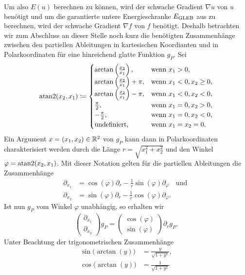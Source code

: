 Um also $E(u)$ berechnen zu können, wird der schwache Gradient $\nabla u$ von
$u$ benötigt und um die garantierte untere Energieschranke $E_\textup{GLEB}$ aus
 zu berechnen, wird der schwache Gradient $\nabla f$ von $f$
benötigt.
Deshalb betrachten wir zum Abschluss an dieser Stelle noch kurz die benötigten
Zusammenhänge zwischen den partiellen Ableitungen in kartesischen Koordianten
und in Polarkoordinaten für eine hinreichend glatte Funktion $g_P$.
Sei
\begin{align*}
  \operatorname{atan2}(x_2,x_1)\coloneqq
  \begin{cases}
    \arctan\left( \frac{x_2}{x_1} \right),& \text{wenn }x_1>0,\\
    \arctan\left( \frac{x_2}{x_1} \right) +\pi,& \text{wenn }x_1<0,x_2\geq 0,\\
    \arctan\left( \frac{x_2}{x_1} \right) -\pi,& \text{wenn }x_1<0,x_2<0,\\
    \frac{\pi}{2},& \text{wenn }x_1=0,x_2>0,\\
    -\frac{\pi}{2},& \text{wenn }x_1=0,x_2<0,\\
    \text{undefiniert},& \text{wenn }x_1=x_2=0.
  \end{cases}
\end{align*}
Ein Argument $x=(x_1,x_2)\in\mathbb{R}^2$ von $g_P$ kann dann in Polarkoordinaten 
charakterisiert werden durch die Länge $r=\sqrt{x_1^2+x_2^2}$ und den Winkel
$\varphi = \operatorname{atan2}(x_2,x_1)$.
Mit dieser Notation gelten für die partiellen Ableitungen die Zusammenhänge
\begin{align*}
  \partial_{x_1} &= 
  \cos(\varphi)\partial_r - \frac{1}{r}\sin(\varphi)\partial_\varphi
  \quad\text{und }\\
  \partial_{x_2} &= 
  \sin(\varphi)\partial_r - \frac{1}{r}\cos(\varphi)\partial_\varphi.
\end{align*}
Ist nun $g_P$ vom Winkel $\varphi$ unabhängig, so erhalten wir
\begin{align*}
  \begin{pmatrix}
    \partial_{x_1}\\
    \partial_{x_2}
  \end{pmatrix}
  g_P 
  = 
  \begin{pmatrix}
    \cos(\varphi)\\
    \sin(\varphi)
  \end{pmatrix}
  \partial_r g_P.
\end{align*}
Unter Beachtung der trigonometrischen Zusammenhänge
\begin{align*}
  \sin\big(\arctan(y)\big) &= \frac{y}{\sqrt{1+y^2}},\\
  \cos\big(\arctan(y)\big) &= \frac{1}{\sqrt{1+y^2}}
\end{align*}
